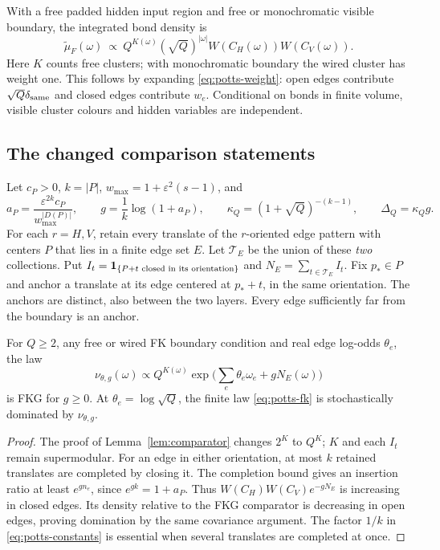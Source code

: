 With a free padded hidden input region and free or monochromatic visible boundary, the integrated bond density is
\begin{equation}\label{eq:potts-fk}
 \widetilde\mu_F(\omega)\ \propto\
 Q^{K(\omega)}(\sqrt Q)^{|\omega|}
 W(C_H(\omega))W(C_V(\omega)).
\end{equation}
Here $K$ counts free clusters; with monochromatic boundary the wired cluster has weight one. This follows by expanding \eqref{eq:potts-weight}: open edges contribute $\sqrt Q\delta_{\rm same}$ and closed edges contribute $w_e$. Conditional on bonds in finite volume, visible cluster colours and hidden variables are independent.

\subsection{The changed comparison statements}\label{sec:potts-lemmas}
Let $c_P>0$, $k=|P|$, $w_{\max}=1+\varepsilon^2(s-1)$, and
\begin{equation}\label{eq:potts-constants}
 a_P=\frac{\varepsilon^{2k} c_P}{w_{\max}^{|D(P)|}},\qquad
 g=\frac1k\log(1+a_P),\qquad
 \kappa_Q=(1+\sqrt Q)^{-(k-1)},\qquad \Delta_Q=\kappa_Q g.
\end{equation}
For each $r=H,V$, retain every translate of the $r$-oriented edge pattern with centers $P$ that lies in a finite edge set $E$. Let $\mathcal T_E$ be the union of these \emph{two} collections. Put $I_t=\mathbf 1_{\{P+t\text{ closed in its orientation}\}}$ and $N_E=\sum_{t\in\mathcal T_E}I_t$. Fix $p_*\in P$ and anchor a translate at its edge centered at $p_*+t$, in the same orientation. The anchors are distinct, also between the two layers. Every edge sufficiently far from the boundary is an anchor.

\begin{lemma}\label{lem:potts-comparator}
For $Q\ge2$, any free or wired FK boundary condition and real edge log-odds $\theta_e$, the law
\[
 \nu_{\theta,g}(\omega)\propto
 Q^{K(\omega)}\exp\bigl(\sum_e\theta_e\omega_e+gN_E(\omega)\bigr)
\]
is FKG for $g\ge0$. At $\theta_e=\log\sqrt Q$, the finite law \eqref{eq:potts-fk} is stochastically dominated by $\nu_{\theta,g}$.
\end{lemma}
\begin{proof}
The proof of Lemma~\ref{lem:comparator} changes $2^K$ to $Q^K$; $K$ and each $I_t$ remain supermodular. For an edge in either orientation, at most $k$ retained translates are completed by closing it. The completion bound gives an insertion ratio at least $e^{gn_e}$, since $e^{gk}=1+a_P$. Thus
$W(C_H)W(C_V)e^{-gN_E}$ is increasing in closed edges. Its density relative to the FKG comparator is decreasing in open edges, proving domination by the same covariance argument. The factor $1/k$ in \eqref{eq:potts-constants} is essential when several translates are completed at once.
\end{proof}

